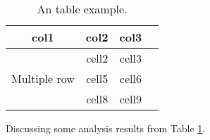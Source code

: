 \begin{table}[!htb]
    \centering
    \begin{tabular}{|c|c|c|c|}
        \hline
        col1 & col2 & col3 \\
        \hline
        \multirow{3}{4em}{Multiple row} & cell2 & cell3 \\
        & cell5 & cell6 \\
        & cell8 & cell9 \\
        \hline
    \end{tabular}
    \caption{An table example.}
    \label{multirow-table}
\end{table}

Discussing some analysis results from Table \ref{multirow-table}.

